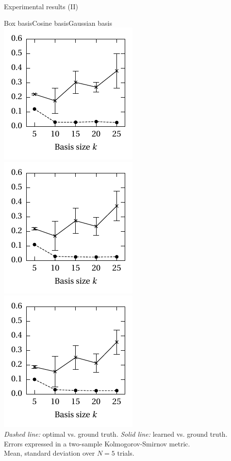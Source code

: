 \documentclass[aspectratio=169]{beamer}
\begin{document}
\begin{frame}{Experimental results (II)}

\centering
{\color{violet}\hspace{1cm}Box basis\hspace{2cm}Cosine basis\hspace{1.75cm}Gaussian basis}\\
\includegraphics[scale=0.85]{../media/net_probability_box_errs.pdf}
\includegraphics[scale=0.85]{../media/net_probability_cosine_errs.pdf}
\includegraphics[scale=0.85]{../media/net_probability_gaussian_errs.pdf}\\[0.25cm]

\footnotesize
\centering
{\color{violet}\emph{Dashed line:}} optimal vs. ground truth.
{\color{violet}\emph{Solid line:}} learned vs. ground truth.\\[0.25cm]
Errors expressed in a two-sample Kolmogorov-Smirnov metric.\\
Mean, standard deviation over $N = 5$ trials.
\end{frame}
\end{document}
